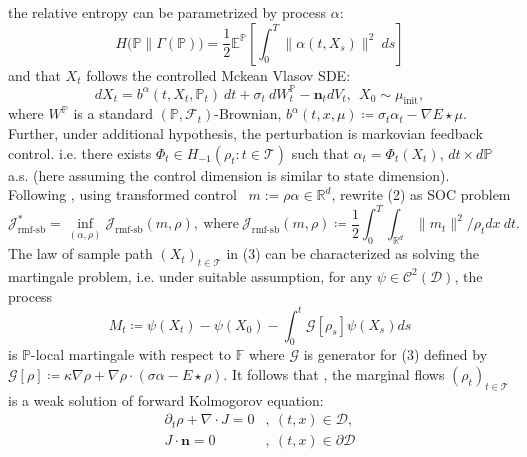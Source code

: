 \documentclass[10pt,a4paper]{article}
\begin{document}
the relative entropy can be parametrized by process $\displaystyle \alpha $:
\begin{equation}
{ H\bigl(\mathbb{P} \parallel \Gamma (\mathbb{P} )\bigr) =\frac{1}{2}\mathbb{E}^{\mathbb{P}}\left[\int _{0}^{T} \| \alpha (t,X_{s} )\| ^{2} \ ds\right]}
\end{equation}
and that $\displaystyle X_{t}$ follows the controlled Mckean Vlasov SDE:
\begin{equation}
dX_{t} =b^{\alpha } (t,X_{t} ,\mathbb{P}_{t} )\ dt+\sigma _{t} \ dW_{t}^{\mathbb{P}} -\mathbf{n}_{t} dV_{t} ,\ \ X_{0} \sim \mu _{\text{init}} ,
\end{equation}where $W^{\mathbb{P}}$ is a standard $(\mathbb{P} ,\mathcal{F}_{t} )$-Brownian, $\displaystyle b^{\alpha } (t,x,\mu )\coloneq \sigma _{t} \alpha _{t} -{\displaystyle \nabla E\star \mu }$. Further, under additional hypothesis, the perturbation is markovian feedback control. i.e. there exists $\displaystyle \Phi _{t} \in H_{-1}( \rho _{t} :t\in \mathcal{T})$ such that $\displaystyle \alpha _{t} =\Phi _{t}( X_{t})$, $\displaystyle dt\times d\mathbb{P}$ a.s. (here assuming the control dimension is similar to state dimension). Following \cite{}, using transformed control \ $\displaystyle m:=\rho \alpha \in \mathbb{R}^{d}$, rewrite (2) 
as SOC problem
\begin{equation}
\mathcal{J}_{\text{rmf-sb}}^{*} =\inf_{(\alpha ,\rho )}\mathcal{J}_{\text{rmf-sb}} (m,\rho ) ,\ \text{where} \ \mathcal{J}_{\text{rmf-sb}}( m,\rho ) \coloneq { \frac{1}{2}\int _{0}^{T}\int _{\mathbb{R}^{d}} \| m_{t} \| ^{2} /\rho _{t} dx\ dt.}
\end{equation}The law of sample path $\displaystyle ( X_{t})_{t\in \mathcal{T}}$ in (3) can be characterized as solving the martingale problem, i.e. under suitable assumption, for any $\displaystyle \psi \in \mathcal{C}^{2}(\mathcal{D})$, the process 
\begin{equation}
{\textstyle M_{t} \coloneq \psi ( X_{t}) -\psi ( X_{0}) -\int _{0}^{t}\mathcal{G}[ \rho _{s}] \psi ( X_{s}) ds}
\end{equation}is $\displaystyle \mathbb{P}$-local martingale with respect to $\displaystyle \mathbb{F}$ where $\displaystyle \mathcal{G}$ is generator for (3) defined by $\displaystyle \mathcal{G}[ \rho ] \coloneq \kappa \nabla \rho +\nabla \rho \cdot ( \sigma \alpha -E\star \rho )$. It follows that \cite{}, the marginal flows $\displaystyle ( \rho _{t})_{t\in \mathcal{T}}$ is a weak solution of forward Kolmogorov equation:
\begin{equation}
\begin{aligned}
\partial _{t} \rho +\nabla \cdot J =0 & ,\ ( t,x) \in \mathcal{D} ,\\
J\cdot \mathbf{n} =0 & ,\ ( t,x) \in \partial \mathcal{D}
\end{aligned}
\end{equation}
\end{document}
